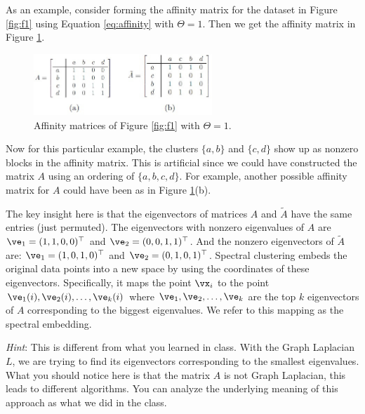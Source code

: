 \documentclass[openany]{ctexbook}
\theoremstyle{kaiti}
\theoremstyle{normal}
\begin{document}
As an example, consider forming the affinity matrix for the dataset in Figure \ref{fig:f1} using Equation \ref{eq:affinity} with $\Theta=1$. Then we get the affinity matrix in Figure \ref{fig:f2}.
\begin{figure}[ht]
  \centering
  \includegraphics[width=0.6\textwidth]{matrices.jpg}
  \caption{Affinity matrices of Figure \ref{fig:f1} with $\Theta=1$.} 
  \label{fig:f2}
\end{figure}

Now for this particular example, the clusters $\{a, b\}$ and $\{c, d\}$ show up as nonzero blocks in the affinity matrix. This is artificial since we could have constructed the matrix $A$ using an ordering of $\{a, b, c, d\}$. For example, another possible affinity matrix for $A$ could have been as in Figure \ref{fig:f2}(b).

The key insight here is that the eigenvectors of matrices $A$ and $\tilde{A}$ have the same entries (just permuted). The eigenvectors with nonzero eigenvalues of $A$ are $\ve_{1}=(1, 1, 0, 0)^\top$ and $\ve_{2}=(0, 0, 1, 1)^\top$. And the nonzero eigenvectors of $\tilde{A}$ are: $\ve_{1}=(1, 0, 1, 0)^\top$ and $\ve_{2}=(0, 1, 0, 1)^\top$. Spectral clustering embeds the original data points into a new space by using the coordinates of these eigenvectors. Specifically, it maps the point $\vx_{i}$ to the point $\ve_{1}(i), \ve_{2}(i),\dots, \ve_{k}(i)$ where $\ve_{1},\ve_{2},\dots, \ve_{k}$ are the top $k$ eigenvectors of $A$ corresponding to the biggest eigenvalues. We refer to this mapping as the spectral embedding.

\emph{Hint}: This is different from what you learned in class. With the Graph Laplacian $L$, we are trying to find its eigenvectors corresponding to the smallest eigenvalues. What you should notice here is that the matrix $A$ is not Graph Laplacian, this leads to different algorithms. You can analyze the underlying meaning of this approach as what we did in the class.
\end{document}
